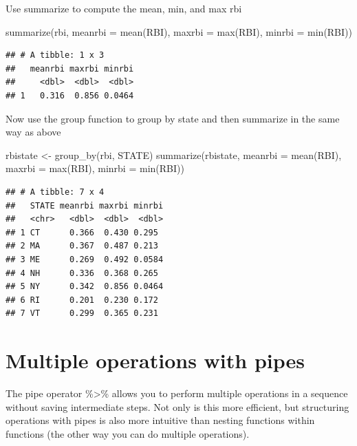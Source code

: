 \documentclass[
]{book}
\newenvironment{Shaded}{\begin{snugshade}}{\end{snugshade}}
\newcommand{\AttributeTok}[1]{\textcolor[rgb]{0.77,0.63,0.00}{#1}}
\newcommand{\FunctionTok}[1]{\textcolor[rgb]{0.00,0.00,0.00}{#1}}
\newcommand{\NormalTok}[1]{#1}
\newcommand{\OtherTok}[1]{\textcolor[rgb]{0.56,0.35,0.01}{#1}}
\begin{document}
Use summarize to compute the mean, min, and max rbi

\begin{Shaded}
\begin{Highlighting}[]
\FunctionTok{summarize}\NormalTok{(rbi, }\AttributeTok{meanrbi =} \FunctionTok{mean}\NormalTok{(RBI), }\AttributeTok{maxrbi =} \FunctionTok{max}\NormalTok{(RBI), }\AttributeTok{minrbi =} \FunctionTok{min}\NormalTok{(RBI))}
\end{Highlighting}
\end{Shaded}

\begin{verbatim}
## # A tibble: 1 x 3
##   meanrbi maxrbi minrbi
##     <dbl>  <dbl>  <dbl>
## 1   0.316  0.856 0.0464
\end{verbatim}

Now use the group function to group by state and then summarize in the same way as above

\begin{Shaded}
\begin{Highlighting}[]
\NormalTok{rbistate }\OtherTok{\textless{}{-}} \FunctionTok{group\_by}\NormalTok{(rbi, STATE)}
\FunctionTok{summarize}\NormalTok{(rbistate, }\AttributeTok{meanrbi =} \FunctionTok{mean}\NormalTok{(RBI), }\AttributeTok{maxrbi =} \FunctionTok{max}\NormalTok{(RBI), }\AttributeTok{minrbi =} \FunctionTok{min}\NormalTok{(RBI))}
\end{Highlighting}
\end{Shaded}

\begin{verbatim}
## # A tibble: 7 x 4
##   STATE meanrbi maxrbi minrbi
##   <chr>   <dbl>  <dbl>  <dbl>
## 1 CT      0.366  0.430 0.295 
## 2 MA      0.367  0.487 0.213 
## 3 ME      0.269  0.492 0.0584
## 4 NH      0.336  0.368 0.265 
## 5 NY      0.342  0.856 0.0464
## 6 RI      0.201  0.230 0.172 
## 7 VT      0.299  0.365 0.231
\end{verbatim}

\hypertarget{multiple-operations-with-pipes}{%
\section{Multiple operations with pipes}\label{multiple-operations-with-pipes}}

The pipe operator \%\textgreater\% allows you to perform multiple operations in a sequence without saving intermediate steps. Not only is this more efficient, but structuring operations with pipes is also more intuitive than nesting functions within functions (the other way you can do multiple operations).
\end{document}
